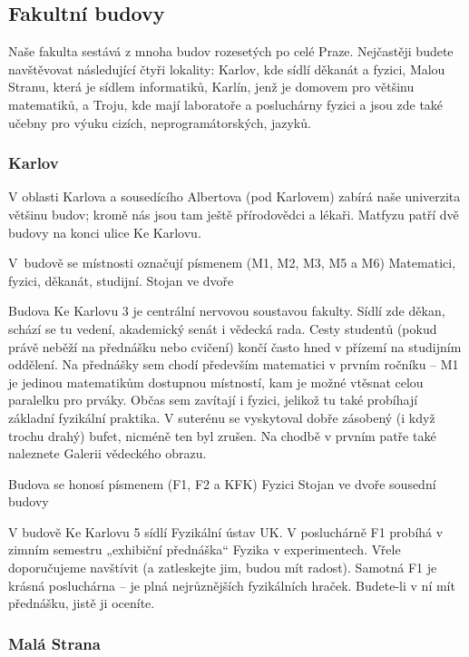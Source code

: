 \subsection{Fakultní budovy}
Naše fakulta sestává z mnoha budov rozesetých po celé Praze. Nejčastěji budete
navštěvovat následující čtyři lokality: Karlov, kde sídlí děkanát a fyzici,
Malou Stranu, která je sídlem informatiků, Karlín, jenž je domovem pro většinu
matematiků, a Troju, kde mají laboratoře a posluchárny fyzici a jsou zde také
učebny pro výuku cizích, neprogramátorských, jazyků.


\subsubsection{Karlov}
V oblasti Karlova a sousedícího Albertova (pod Karlovem) zabírá naše univerzita
většinu budov; kromě nás jsou tam ještě přírodovědci a lékaři. Matfyzu patří dvě
budovy na konci ulice Ke Karlovu.


{V~budově se místnosti označují písmenem  (M1, M2, M3, M5 a M6)}
{Matematici, fyzici, děkanát, studijní.}
{Stojan ve dvoře}

\noindent Budova Ke Karlovu 3 je centrální nervovou soustavou fakulty. Sídlí zde
děkan, schází se tu vedení, akademický senát i vědecká rada. Cesty studentů
(pokud právě neběží na přednášku nebo cvičení) končí často hned v přízemí na
studijním oddělení. Na přednášky sem chodí především matematici v prvním ročníku
– M1 je jedinou matematikům dostupnou místností, kam je možné vtěsnat celou
paralelku pro prváky. Občas sem zavítají i fyzici, jelikož tu také probíhají
základní fyzikální praktika. V suterénu se vyskytoval dobře zásobený (i když
trochu drahý) bufet, nicméně ten byl zrušen. Na chodbě v prvním patře také
naleznete Galerii vědeckého obrazu.


{Budova se honosí písmenem  (F1, F2 a KFK)}
{Fyzici}
{Stojan ve dvoře sousední budovy}

\noindent V budově Ke Karlovu 5 sídlí Fyzikální ústav UK. V posluchárně F1
probíhá v zimním semestru „exhibiční přednáška“ Fyzika v experimentech. Vřele
doporučujeme navštívit (a zatleskejte jim, budou mít radost). Samotná F1 je
krásná posluchárna – je plná nejrůznějších fyzikálních hraček. Budete-li v ní
mít přednášku, jistě ji oceníte.

\subsubsection{Malá Strana}

